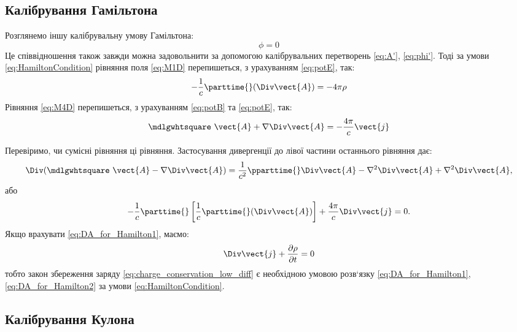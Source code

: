 \subsection*{Калібрування Гамільтона}

Розглянемо іншу калібрувальну умову Гамільтона:
\begin{equation}\label{eq:HamiltonCondition}
	\phi = 0
\end{equation}
Це співвідношення також завжди можна задовольнити за допомогою
калібрувальних перетворень \eqref{eq:A'}, \eqref{eq:phi'}. Тоді за умови \eqref{eq:HamiltonCondition} рівняння
поля \eqref{eq:M1D} перепишеться, з урахуванням \eqref{eq:potE}, так:
\begin{equation}
	-\frac1c \parttime{} (\Div \vect{A}) = -4\pi \rho
\end{equation}
Рівняння \eqref{eq:M4D} перепишеться, з урахуванням \eqref{eq:potB} та \eqref{eq:potE}, так:
\begin{equation}\label{eq:DA_for_Hamilton1}
	\mdlgwhtsquare\ \vect{A}  + \nabla \Div\vect{A} = -\frac{4\pi}{c} \vect{j}
\end{equation}

Перевіримо, чи сумісні рівняння ці рівняння. Застосування
дивергенції до лівої частини останнього рівняння дає:
\begin{equation*}
	\Div(\mdlgwhtsquare\ \vect{A}  - \nabla \Div\vect{A}) = \frac1{c^2} \pparttime{} \Div\vect{A} - \nabla^2\Div\vect{A} + \nabla^2\Div\vect{A},
\end{equation*}
або
\begin{equation}\label{eq:DA_for_Hamilton2}
	-\frac1c \parttime{} \left[ \frac1c \parttime{} (\Div\vect{A})\right] + \frac{4\pi}c \Div\vect{j} = 0.
\end{equation}
Якщо врахувати \eqref{eq:DA_for_Hamilton1}, маємо:
\begin{equation*}
	\Div \vect{j} + \frac{\partial \rho}{\partial t} = 0
\end{equation*}
тобто закон збереження заряду \eqref{eq:charge_conservation_low_diff} є необхідною умовою розв`язку
\eqref{eq:DA_for_Hamilton1}, \eqref{eq:DA_for_Hamilton2} за умови \eqref{eq:HamiltonCondition}.


\subsection*{Калібрування Кулона}

